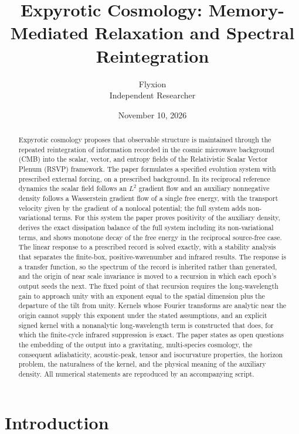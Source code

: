 \documentclass[11pt]{article}
\title{Expyrotic Cosmology: Memory-Mediated Relaxation and Spectral Reintegration}
\author{Flyxion\\ Independent Researcher}
\date{November 10, 2026}
\theoremstyle{definition}
\theoremstyle{remark}
\begin{document}
\maketitle

\begin{abstract}
\noindent
Expyrotic cosmology proposes that observable structure is maintained through the repeated reintegration of information recorded in the cosmic microwave background (CMB) into the scalar, vector, and entropy fields of the Relativistic Scalar Vector Plenum (RSVP) framework. The paper formulates a specified evolution system with prescribed external forcing, on a prescribed background. In its reciprocal reference dynamics the scalar field follows an $L^2$ gradient flow and an auxiliary nonnegative density follows a Wasserstein gradient flow of a single free energy, with the transport velocity given by the gradient of a nonlocal potential; the full system adds non-variational terms. For this system the paper proves positivity of the auxiliary density, derives the exact dissipation balance of the full system including its non-variational terms, and shows monotone decay of the free energy in the reciprocal source-free case. The linear response to a prescribed record is solved exactly, with a stability analysis that separates the finite-box, positive-wavenumber and infrared results. The response is a transfer function, so the spectrum of the record is inherited rather than generated, and the origin of near scale invariance is moved to a recursion in which each epoch's output seeds the next. The fixed point of that recursion requires the long-wavelength gain to approach unity with an exponent equal to the spatial dimension plus the departure of the tilt from unity. Kernels whose Fourier transforms are analytic near the origin cannot supply this exponent under the stated assumptions, and an explicit signed kernel with a nonanalytic long-wavelength term is constructed that does, for which the finite-cycle infrared suppression is exact. The paper states as open questions the embedding of the output into a gravitating, multi-species cosmology, the consequent adiabaticity, acoustic-peak, tensor and isocurvature properties, the horizon problem, the naturalness of the kernel, and the physical meaning of the auxiliary density. All numerical statements are reproduced by an accompanying script.
\end{abstract}

\section{Introduction}\label{sec:intro}
\end{document}
